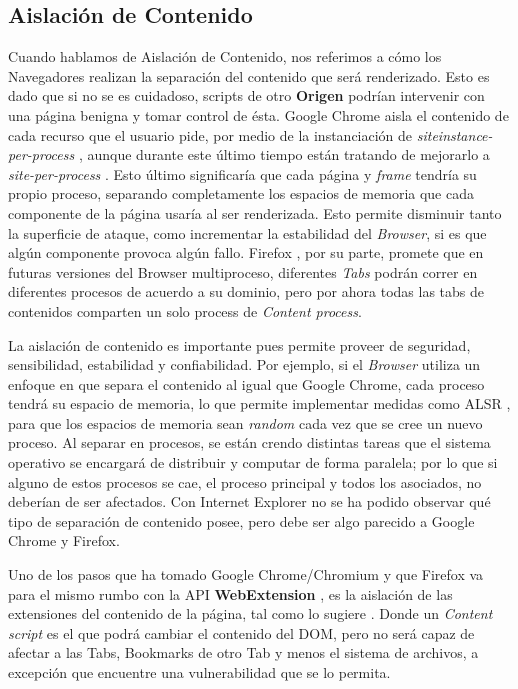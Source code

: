  \subsection{Aislación de Contenido}
    Cuando hablamos de Aislación de Contenido, nos referimos a cómo los Navegadores realizan la separación del contenido que será renderizado. Esto es dado que si no se es cuidadoso, scripts de otro \textbf{Origen} podrían intervenir con una página benigna y tomar control de ésta. Google Chrome aisla el contenido de cada recurso que el usuario pide, por medio de la instanciación de \textit{siteinstance-per-process} \cite{Reis2009}, aunque durante este último tiempo están tratando de mejorarlo a \textit{site-per-process} \cite{GoogleChromeIsolation}. Esto último significaría que cada página y \textit{frame} tendría su propio proceso, separando completamente los espacios de memoria que cada componente de la página usaría al ser renderizada. Esto permite disminuir tanto la superficie de ataque, como incrementar la estabilidad del \textit{Browser}, si es que algún componente provoca algún fallo. Firefox \cite{FirefoxThreatModel}, por su parte, promete que en futuras versiones del Browser multiproceso, diferentes \textit{Tabs} podrán correr en diferentes procesos de acuerdo a su dominio, pero por ahora todas las tabs de contenidos comparten un solo process de \textit{Content process}.

    La aislación de contenido es importante pues permite proveer de seguridad, sensibilidad, estabilidad y confiabilidad. Por ejemplo, si el \textit{Browser} utiliza un enfoque en que separa el contenido al igual que Google Chrome, cada proceso tendrá su espacio de memoria, lo que permite implementar medidas como ALSR \cite{Drake2011}, para que los espacios de memoria sean \textit{random} cada vez que se cree un nuevo proceso. Al separar en procesos, se están crendo distintas tareas que el sistema operativo se encargará de distribuir y computar de forma paralela; por lo que si alguno de estos procesos se cae, el proceso principal y todos los asociados, no deberían de ser afectados. Con Internet Explorer no se ha podido observar qué tipo de separación de contenido posee, pero debe ser algo parecido a Google Chrome y Firefox.
    
    Uno de los pasos que ha tomado Google Chrome/Chromium y que Firefox va para el mismo rumbo con la API \textbf{WebExtension} \cite{AddONFirefox}, es la aislación de las extensiones del contenido de la página, tal como lo sugiere \cite{Barth2010}. Donde un \textit{Content script} es el que podrá cambiar el contenido del DOM, pero no será capaz de afectar a las Tabs, Bookmarks de otro Tab y menos el sistema de archivos, a excepción que encuentre una vulnerabilidad que se lo permita.
    
